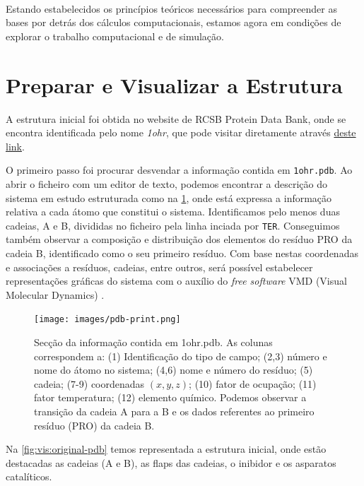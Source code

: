 \documentclass[12pt,a4paper]{article}
\begin{document}
	\paragraph{}Estando estabelecidos os princípios teóricos necessários para compreender as bases por detrás dos cálculos computacionais, estamos agora em condições de explorar o trabalho computacional e de simulação.
\section{Preparar e Visualizar a Estrutura}
	A estrutura inicial foi obtida no website de RCSB Protein Data Bank, onde se encontra identificada pelo nome \textit{1ohr}, que pode visitar diretamente através \href{https://www.rcsb.org/structure/1OHR}{deste link}.
	
	O primeiro passo foi procurar desvendar a informação contida em \verb|1ohr.pdb|. Ao abrir o ficheiro com um editor de texto, podemos encontrar a descrição do sistema em estudo estruturada como na \cref{fig:vis:pdb-print}, onde está expressa a informação relativa a cada átomo que constitui o sistema. Identificamos pelo menos duas cadeias, A e B, divididas no ficheiro pela linha inciada por \verb|TER|. Conseguimos também observar a composição e distribuição dos elementos do resíduo PRO da cadeia B, identificado como o seu primeiro resíduo. Com base nestas coordenadas e associações a resíduos, cadeias, entre outros, será possível estabelecer representações gráficas do sistema com o auxílio do \textit{free software} VMD (Visual Molecular Dynamics) \cite{HUMP96}.
	
	\begin{figure}[h]
		\centering
		\texttt{[image: images/pdb-print.png]}
		\caption{Secção da informação contida em 1ohr.pdb. As colunas correspondem a: (1) Identificação do tipo de campo; (2,3) número e nome do átomo no sistema; (4,6) nome e número do resíduo; (5) cadeia; (7-9) coordenadas $(x,y,z)$; (10) fator de ocupação; (11) fator temperatura; (12) elemento químico. Podemos observar a transição da cadeia A para a B e os dados referentes ao primeiro resíduo (PRO) da cadeia B.}%
		\label{fig:vis:pdb-print}
	\end{figure}
	
	Na \cref{fig:vis:original-pdb} temos representada a estrutura inicial, onde estão destacadas as cadeias (A e B), as flaps das cadeias, o inibidor e os asparatos catalíticos.
\end{document}
